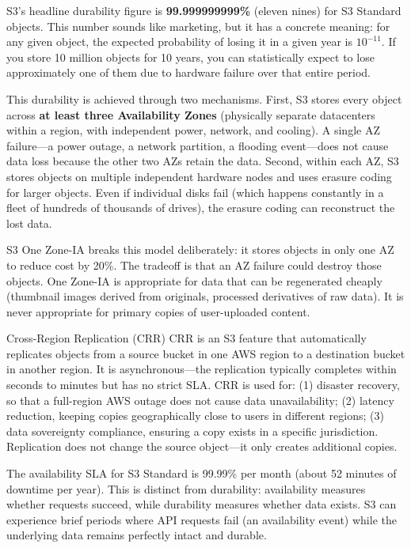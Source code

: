 \documentclass[11pt,a4paper]{article}
\begin{document}
S3's headline durability figure is \textbf{99.999999999\%} (eleven nines) for S3 Standard objects. This number sounds like marketing, but it has a concrete meaning: for any given object, the expected probability of losing it in a given year is $10^{-11}$. If you store 10 million objects for 10 years, you can statistically expect to lose approximately one of them due to hardware failure over that entire period.

This durability is achieved through two mechanisms. First, S3 stores every object across \textbf{at least three Availability Zones} (physically separate datacenters within a region, with independent power, network, and cooling). A single AZ failure---a power outage, a network partition, a flooding event---does not cause data loss because the other two AZs retain the data. Second, within each AZ, S3 stores objects on multiple independent hardware nodes and uses erasure coding for larger objects. Even if individual disks fail (which happens constantly in a fleet of hundreds of thousands of drives), the erasure coding can reconstruct the lost data.

S3 One Zone-IA breaks this model deliberately: it stores objects in only one AZ to reduce cost by 20\%. The tradeoff is that an AZ failure could destroy those objects. One Zone-IA is appropriate for data that can be regenerated cheaply (thumbnail images derived from originals, processed derivatives of raw data). It is never appropriate for primary copies of user-uploaded content.

\begin{termbox}{Cross-Region Replication (CRR)}
CRR is an S3 feature that automatically replicates objects from a source bucket in one AWS region to a destination bucket in another region. It is asynchronous---the replication typically completes within seconds to minutes but has no strict SLA. CRR is used for: (1) disaster recovery, so that a full-region AWS outage does not cause data unavailability; (2) latency reduction, keeping copies geographically close to users in different regions; (3) data sovereignty compliance, ensuring a copy exists in a specific jurisdiction. Replication does not change the source object---it only creates additional copies.
\end{termbox}

The availability SLA for S3 Standard is 99.99\% per month (about 52 minutes of downtime per year). This is distinct from durability: availability measures whether requests succeed, while durability measures whether data exists. S3 can experience brief periods where API requests fail (an availability event) while the underlying data remains perfectly intact and durable.
\end{document}
